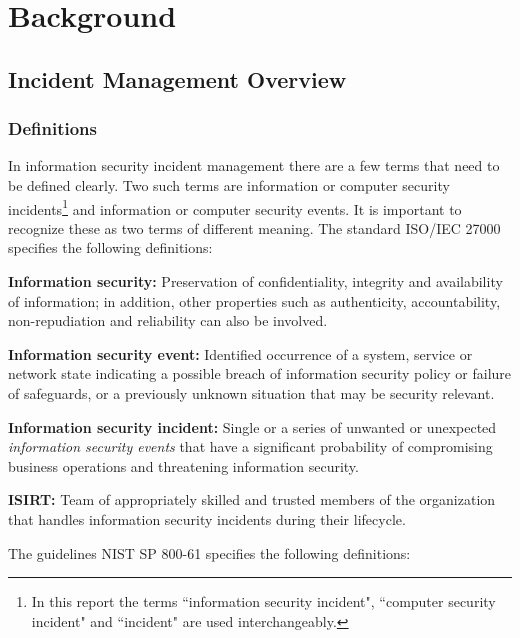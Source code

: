 \chapter{Background}
\label{chp:background}



\section{Incident Management Overview}
\subsection{Definitions}
\label{sec:Definitions}
In information security incident management there are a few terms that need to be defined clearly. Two such terms are information or computer security incidents\footnote{In this report the terms ``information security incident", ``computer security incident" and ``incident" are used interchangeably.} %
and information or computer security events. It is important to recognize these as two terms of different meaning. The standard \acs{ISO}/\acs{IEC} 27000 \cite{ISO/IEC27000} specifies the following definitions:

\textbf{Information security:} Preservation of confidentiality, integrity and availability of information; in addition, other properties such as authenticity, accountability, non-repudiation and reliability can also be involved.

\textbf{Information security event:} Identified occurrence of a system, service or network state indicating a possible breach of information security policy or failure of safeguards, or a previously unknown situation that may be security relevant.

\textbf{Information security incident:} Single or a series of unwanted or unexpected \emph{information security events} that have a significant probability of compromising business operations and threatening information security.

\textbf{\ac{ISIRT}:} Team of appropriately skilled and trusted members of the organization that handles information security incidents during their lifecycle.

The guidelines \acs{NIST} SP 800-61 \cite{nist800-61} specifies the following definitions:

